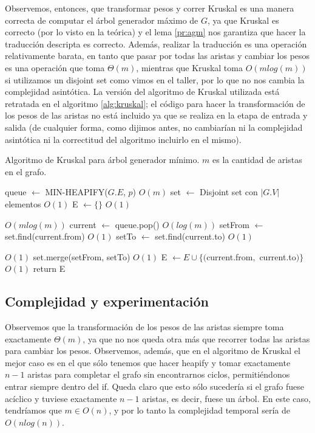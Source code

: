 \documentclass{article}
\theoremstyle{definition}
\theoremstyle{remark}
\begin{document}
Observemos, entonces, que transformar pesos y correr Kruskal es una manera correcta de computar el árbol generador máximo de $G$, ya que Kruskal es correcto (por lo visto en la teórica) y el lema \ref{pr:agm} nos garantiza que hacer la traducción descripta es correcto. Además, realizar la traducción es una operación relativamente barata, en tanto que pasar por todas las aristas y cambiar los pesos es una operación que toma $\Theta(m)$, mientras que Kruskal toma $O(m log(m))$ si utilizamos un disjoint set como vimos en el taller, por lo que no nos cambia la complejidad asintótica. La versión del algoritmo de Kruskal utilizada está retratada en el algoritmo \ref{alg:kruskal}; el código para hacer la transformación de los pesos de las aristas no está incluido ya que se realiza en la etapa de entrada y salida (de cualquier forma, como dijimos antes, no cambiarían ni la complejidad asintótica ni la correctitud del algoritmo incluirlo en el mismo).

\begin{algorithm}[h!]
\caption{Algoritmo de Kruskal para árbol generador mínimo. $m$ es la cantidad de aristas en el grafo. \label{alg:kruskal}}

\begin{algorithmic}[h!]
\State queue $\gets$ MIN-HEAPIFY($G.E$, $p$) \Comment $O(m)$
\State set $\gets$ Disjoint set con $|G.V|$ elementos \Comment $O(1)$
\State E $\gets \{\}$ \Comment $O(1)$

 \Comment $O(m log(m))$
\State current $\gets$ queue.pop() \Comment $O(log(m))$
\State setFrom $\gets$ set.find(current.from) \Comment $O(1)$
\State setTo $\gets$ set.find(current.to) \Comment $O(1)$

 \Comment $O(1)$
\State set.merge(setFrom, setTo) \Comment $O(1)$
\State E $\gets E \cup \{($current.from$,$ current.to$)\}$ \Comment $O(1)$
\EndIf
\EndWhile
\State return E
\EndProcedure
\end{algorithmic}
\end{algorithm}

\subsection{Complejidad y experimentación}

Observemos que la transformación de los pesos de las aristas siempre toma exactamente $\Theta(m)$, ya que no nos queda otra más que recorrer todas las aristas para cambiar los pesos. Observemos, además, que en el algoritmo de Kruskal el mejor caso es en el que sólo tenemos que hacer heapify y tomar exactamente $n - 1$ aristas para completar el grafo sin encontrarnos ciclos, permitiéndonos entrar siempre dentro del if. Queda claro que esto sólo sucedería si el grafo fuese acíclico y tuviese exactamente $n - 1$ aristas, es decir, fuese un árbol. En este caso, tendríamos que $m \in O(n)$, y por lo tanto la complejidad temporal sería de $O(n log(n))$.
\end{document}
